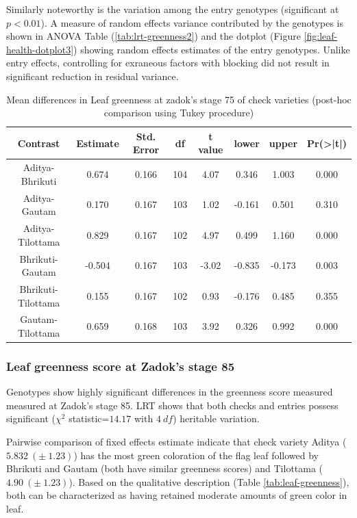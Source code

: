 \documentclass[12pt,oneside]{dukestatscithesis} %
\begin{document}
Similarly noteworthy is the variation among the entry genotypes (significant at \(p < 0.01\)). A measure of random effects variance contributed by the genotypes is shown in ANOVA Table (\ref{tab:lrt-greenness2}) and the dotplot (Figure \ref{fig:leaf-health-dotplot3}) showing random effects estimates of the entry genotypes. Unlike entry effects, controlling for exraneous factors with blocking did not result in significant reduction in residual variance.
\begin{table}[H]

\caption{\label{tab:leaf-health-meanconf-tab3}Mean differences in Leaf greenness at zadok's stage 75 of check varieties (post-hoc comparison using Tukey procedure)}
\centering
\begin{tabular}[t]{cccccccc}
\toprule
Contrast & Estimate & Std. Error & df & t value & lower & upper & Pr(>|t|)\\
\midrule
Aditya-Bhrikuti & 0.674 & 0.166 & 104 & 4.07 & 0.346 & 1.003 & 0.000\\
Aditya-Gautam & 0.170 & 0.167 & 103 & 1.02 & -0.161 & 0.501 & 0.310\\
Aditya-Tilottama & 0.829 & 0.167 & 102 & 4.97 & 0.499 & 1.160 & 0.000\\
Bhrikuti-Gautam & -0.504 & 0.167 & 103 & -3.02 & -0.835 & -0.173 & 0.003\\
Bhrikuti-Tilottama & 0.155 & 0.167 & 102 & 0.93 & -0.176 & 0.485 & 0.355\\
Gautam-Tilottama & 0.659 & 0.168 & 103 & 3.92 & 0.326 & 0.992 & 0.000\\
\bottomrule
\end{tabular}
\end{table}
\hypertarget{leaf-greenness-score-at-zadoks-stage-85}{%
\subsubsection{Leaf greenness score at Zadok's stage 85}\label{leaf-greenness-score-at-zadoks-stage-85}}

Genotypes show highly significant differences in the greenness score measured measured at Zadok's stage 85. LRT shows that both checks and entries possess significant (\(\chi^2\) statistic=\(14.17\) with \(4\ df\)) heritable variation.

Pairwise comparison of fixed effects estimate indicate that check variety Aditya (\(5.832\ (\pm\ 1.23)\)) has the most green coloration of the flag leaf followed by Bhrikuti and Gautam (both have similar greenness scores) and Tilottama (\(4.90\ (\pm\ 1.23)\)). Based on the qualitative description (Table \ref{tab:leaf-greenness}), both can be characterized as having retained moderate amounts of green color in leaf.
\end{document}
